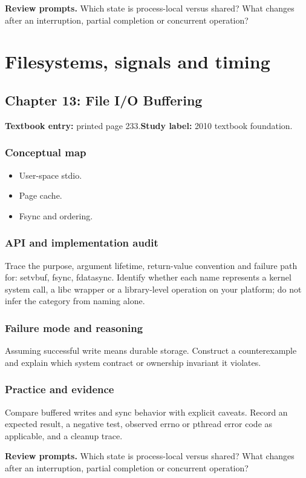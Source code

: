 \documentclass[11pt,letterpaper,oneside]{report}
\begin{document}
\textbf{Review prompts.} Which state is process-local versus shared? What changes after an interruption, partial completion or concurrent operation?

\chapter{Filesystems, signals and timing}
\section{Chapter 13: File I/O Buffering}
\textbf{Textbook entry:} printed page 233.\quad \textbf{Study label:} 2010 textbook foundation.

\subsection{Conceptual map}
\begin{itemize}
\item User-space stdio.
\item Page cache.
\item Fsync and ordering.
\end{itemize}
\subsection{API and implementation audit}
Trace the purpose, argument lifetime, return-value convention and failure path for: setvbuf, fsync, fdatasync. Identify whether each name represents a kernel system call, a libc wrapper or a library-level operation on your platform; do not infer the category from naming alone.

\subsection{Failure mode and reasoning}
Assuming successful write means durable storage. Construct a counterexample and explain which system contract or ownership invariant it violates.

\subsection{Practice and evidence}
Compare buffered writes and sync behavior with explicit caveats. Record an expected result, a negative test, observed errno or pthread error code as applicable, and a cleanup trace.

\textbf{Review prompts.} Which state is process-local versus shared? What changes after an interruption, partial completion or concurrent operation?
\end{document}
